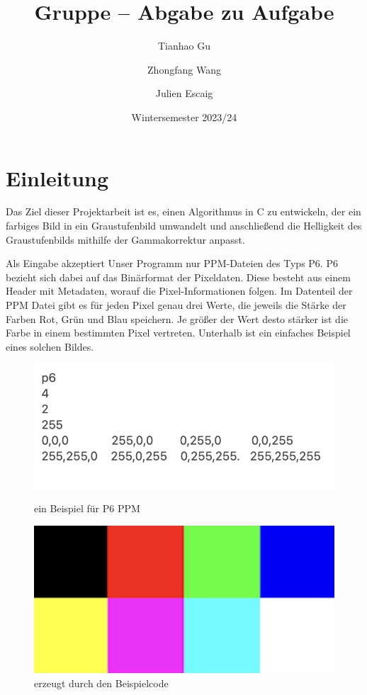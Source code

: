 \documentclass[course=erap]{aspdoc}
\author{Tianhao Gu \and Zhongfang Wang \and Julien Escaig}
\date{Wintersemester 2023/24} %
\title{Gruppe \theGroup{} -- Abgabe zu Aufgabe \theNumber}
\begin{document}
\maketitle

\section{Einleitung}

\par
Das Ziel dieser Projektarbeit ist es, einen Algorithmus in C zu entwickeln, der ein farbiges Bild in ein Graustufenbild umwandelt und anschließend die Helligkeit des Graustufenbilds mithilfe der Gammakorrektur anpasst.

\par
Als Eingabe akzeptiert Unser Programm nur PPM-Dateien\cite{netpbm} des Typs P6. P6 bezieht sich dabei auf das Binärformat der Pixeldaten.  Diese besteht aus einem Header mit Metadaten, worauf die Pixel-Informationen folgen. Im Datenteil der PPM Datei gibt es für jeden Pixel genau drei Werte, die jeweils die Stärke der Farben Rot, Grün und Blau speichern. Je größer der Wert desto stärker ist die Farbe in einem bestimmten Pixel vertreten. Unterhalb ist ein einfaches Beispiel eines solchen Bildes.

\begin{figure}[h]
\begin{minipage}{0.45\textwidth}
\centering
\includegraphics[width=\textwidth]{Bilder/demograph.png}
\caption{ein Beispiel für P6 PPM}
\end{minipage}
\hfill
\begin{minipage}{0.45\textwidth}
\centering
\includegraphics[width=\textwidth]{Bilder/demograph.ppm.png}
\caption{erzeugt durch den Beispielcode}
\end{minipage}
\end{figure}
\end{document}
